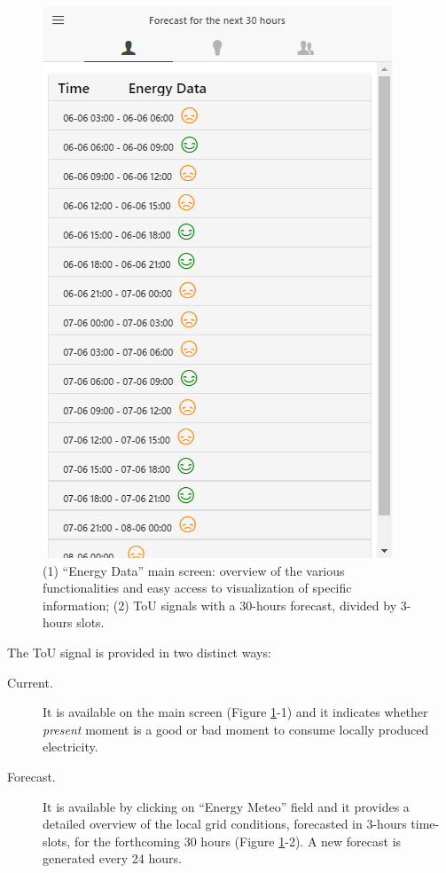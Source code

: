 \begin{figure}[htb]
\begin{center}
\begin{minipage}[htb]{0.45\linewidth}
         \includegraphics[width=1\linewidth]{img/touprediction.png}   
        \end{minipage}
      \end{center}
      \caption{(1) ``Energy Data'' main screen: overview of the various functionalities and easy access to visualization of specific information;
(2) ToU signals with a 30-hours forecast, divided by 3-hours slots.}\label{fig:overview-tou}
\end{figure}

The ToU signal is provided in two distinct ways:
\begin{description}
 \item[Current.] It is available on the main screen (Figure \ref{fig:overview-tou}-1) and it indicates whether \textit{present} moment is a good or bad moment to consume locally produced electricity.
 \item[Forecast.] It is available by clicking on ``Energy Meteo'' field and it provides a detailed overview of the local grid conditions, forecasted in 3-hours time-slots, for the forthcoming 30 hours (Figure \ref{fig:overview-tou}-2). A new forecast is generated every 24 hours.
\end{description}



